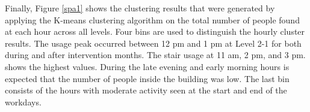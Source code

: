 Finally, Figure \ref{spa1} shows the clustering results that were generated by applying the K-means clustering algorithm on the total number of people found at each hour across all levels. Four bins are used to distinguish the hourly cluster results. The usage peak occurred between 12 pm and 1 pm at Level 2-1 for both during and after intervention months. The stair usage at 11 am, 2 pm, and 3 pm. shows the highest values. During the late evening and early morning hours is expected that the number of people inside the building was low. The last bin consists of the hours with moderate activity seen at the start and end of the workdays. 













